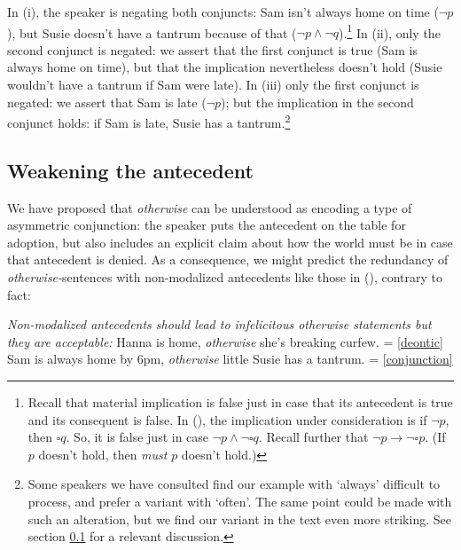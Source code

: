 
In (i), the speaker is negating both conjuncts: Sam isn't always home on time ($\neg p$), but Susie doesn't have a tantrum because of that ($\neg p \wedge \neg q$).\footnote{Recall that material implication is false just in case that its antecedent is true and its consequent is false. In (\blastx), the implication under consideration is if $\neg p$, then $\square q$. So, it is false just in case  $\neg p \wedge \neg \square q$. Recall further that $\neg p \rightarrow \neg \square p$. (If $p$ doesn't hold, then \textit{must} $p$ doesn't hold.)} In (ii), only the second conjunct is negated: we assert that the first conjunct is true (Sam is always home on time), but that the implication nevertheless doesn't hold (Susie wouldn't have a tantrum if Sam were late). In (iii) only the first conjunct is negated: we assert that Sam is late ($\neg p$); but the implication in the second conjunct holds: if Sam is late, Susie has a tantrum.\footnote{Some speakers we have consulted find our example with `always' difficult to process, and prefer a variant with `often'. The same point could be made with such an alteration, but we find our variant in the text even more striking. See section \ref{weakening} for a relevant discussion.} 

%
\subsection{Weakening the antecedent}
\label{weakening}

We have proposed that \textit{otherwise} can be understood as encoding a type of asymmetric conjunction: the speaker puts the antecedent on the table for adoption, but also includes an explicit claim about how the world must be in case that antecedent is denied. As a consequence, we might predict the redundancy of \textit{otherwise-}sentences with non-modalized antecedents like those in (\nextx), contrary to fact:


\pex  \label{declarative-ant} \textit{Non-modalized antecedents should lead to infelicitous \textit{otherwise}  statements but they are acceptable:} %
\a  \label{weakA} Hanna is home, \textit{otherwise} she's breaking curfew. \hfill= \ref{deontic}
\a  \label{weakB} {\small Sam is always home by 6pm, \textit{otherwise }little Susie has a tantrum.} \hfill= \ref{conjunction}\xe

